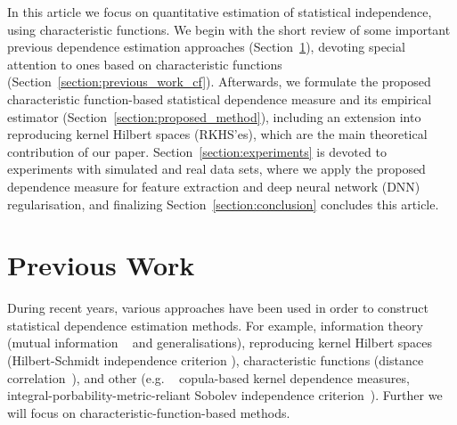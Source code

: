 \documentclass{article}
\begin{document}
In this article we focus on quantitative estimation of statistical independence, using characteristic functions. We begin with the short review of some important previous dependence estimation approaches (Section~\ref{section:previous_work}), devoting special attention to ones based on characteristic functions (Section~\ref{section:previous_work_cf}). Afterwards, we formulate the proposed characteristic function-based statistical dependence measure and its empirical estimator (Section~\ref{section:proposed_method}), including an extension into reproducing kernel Hilbert spaces (RKHS'es), which are the main theoretical contribution of our paper. Section~\ref{section:experiments} is devoted to experiments with simulated and real data sets, where we apply the proposed dependence measure for feature extraction and deep neural network (DNN) regularisation,  and finalizing Section~\ref{section:conclusion} concludes this article.

\section{Previous Work}
\label{section:previous_work}
During recent years, various approaches have been used in order to construct statistical dependence estimation methods. For example, information theory (mutual information ~\cite{Cover2006} and generalisations), reproducing kernel Hilbert spaces (Hilbert-Schmidt independence criterion \cite{Gretton2005MeasuringSD}), characteristic functions (distance correlation~\cite{Feuerverger, Szekely}), and other (e.g. ~\cite{Pczos2012CopulabasedKD} copula-based kernel dependence measures, integral-porbability-metric-reliant Sobolev independence criterion~\cite{NIPS2019_9147}).
Further we will focus on characteristic-function-based methods. 
\end{document}
